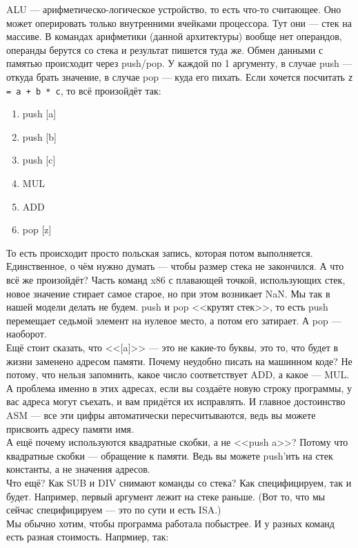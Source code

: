 \documentclass{article}
\begin{document}
    ALU --- арифметическо-логическое устройство, то есть что-то считающее. Оно может оперировать только внутренними ячейками процессора. Тут они --- стек на массиве. В командах арифметики (данной архитектуры) вообще нет операндов, операнды берутся со стека и результат пишется туда же. Обмен данными с памятью происходит через push/pop. У каждой по 1 аргументу, в случае push --- откуда брать значение, в случае pop --- куда его пихать. Если хочется посчитать \texttt{z = a + b * c}, то всё произойдёт так:
    \begin{enumerate}
        \item push [a]
        \item push [b]
        \item push [c]
        \item MUL
        \item ADD
        \item pop [z]
    \end{enumerate}
    То есть происходит просто польская запись, которая потом выполняется. Единственное, о чём нужно думать --- чтобы размер стека не закончился. А что всё же произойдёт? Часть команд x86 с плавающей точкой, использующих стек, новое значение стирает самое старое, но при этом возникает NaN. Мы так в нашей модели делать не будем. push и pop <<крутят стек>>, то есть push перемещает седьмой элемент на нулевое место, а потом его затирает. А pop --- наоборот.\\
    Ещё стоит сказать, что <<[a]>> --- это не какие-то буквы, это то, что будет в жизни заменено адресом памяти. Почему неудобно писать на машинном коде? Не потому, что нельзя запомнить, какое число соответствует ADD, а какое --- MUL. А проблема именно в этих адресах, если вы создаёте новую строку программы, у вас адреса могут съехать, и вам придётся их исправлять. И главное достоинство ASM --- все эти цифры автоматически пересчитываются, ведь вы можете присвоить адресу памяти имя.\\
    А ещё почему используются квадратные скобки, а не <<push a>>? Потому что квадратные скобки --- обращение к памяти. Ведь вы можете push'ить на стек константы, а не значения адресов.\\
    Что ещё? Как SUB и DIV снимают команды со стека? Как специфицируем, так и будет. Например, первый аргумент лежит на стеке раньше. (Вот то, что мы сейчас специфицируем --- это по сути и есть ISA.)\\
    Мы обычно хотим, чтобы программа работала побыстрее. И у разных команд есть разная стоимость. Напрмиер, так:
\end{document}
